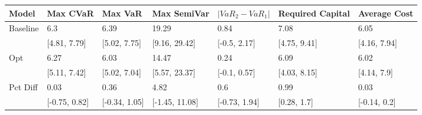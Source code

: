 \begin{tabular}{lllllll}
\toprule
   Model &      Max CVaR &       Max VaR &    Max SemiVar & $|VaR_2 - VaR_1|$ & Required Capital & Average Cost \\
\midrule
Baseline &           6.3 &          6.39 &          19.29 &              0.84 &             7.08 &         6.05 \\
         &  [4.81, 7.79] &  [5.02, 7.75] &  [9.16, 29.42] &      [-0.5, 2.17] &     [4.75, 9.41] & [4.16, 7.94] \\
     Opt &          6.27 &          6.03 &          14.47 &              0.24 &             6.09 &         6.02 \\
         &  [5.11, 7.42] &  [5.02, 7.04] &  [5.57, 23.37] &      [-0.1, 0.57] &     [4.03, 8.15] &  [4.14, 7.9] \\
Pct Diff &          0.03 &          0.36 &           4.82 &               0.6 &             0.99 &         0.03 \\
         & [-0.75, 0.82] & [-0.34, 1.05] & [-1.45, 11.08] &     [-0.73, 1.94] &      [0.28, 1.7] & [-0.14, 0.2] \\
\bottomrule
\end{tabular}
